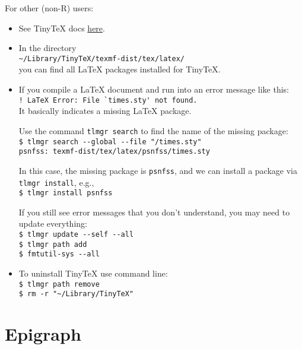 \documentclass[]{article}
\begin{document}
For other (non-R) users:
\begin{itemize}

    \item See TinyTeX docs \href{https://yihui.org/tinytex/}{here}.

    \item In the directory \\
          \verb|~/Library/TinyTeX/texmf-dist/tex/latex/| \\
          you can find all \LaTeX{} packages installed for TinyTeX.
    
    \item If you compile a LaTeX document and run into an error message 
          like this:\\
          \verb+! LaTeX Error: File `times.sty' not found.+ \\
          It basically indicates a missing LaTeX package.

          Use the command \verb+tlmgr search+ to find the name of 
          the missing package:\\
          \verb+$ tlmgr search --global --file "/times.sty"+\\
          \verb+psnfss: texmf-dist/tex/latex/psnfss/times.sty+

          In this case, the missing package is \verb+psnfss+, and we 
          can install a package via \verb+tlmgr install+, e.g., \\
          \verb+$ tlmgr install psnfss+

          If you still see error messages that you don’t understand, 
          you may need to update everything:\\
          \verb+$ tlmgr update --self --all+\\
          \verb+$ tlmgr path add+\\
          \verb+$ fmtutil-sys --all+
    
    \item To uninstall TinyTeX use command line:\\
          \verb+$ tlmgr path remove+\\
          \verb+$ rm -r "~/Library/TinyTeX"+
          
\end{itemize}


\section{Epigraph}
\end{document}
